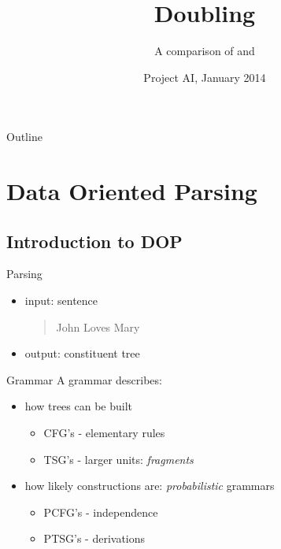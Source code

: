 \documentclass{beamer}
\title{Doubling \dops}
\subtitle{ A comparison of \ddop{} and \dops{}}
\author[Kruit, Veldhoen]{Benno Kruit\and Sara Veldhoen{\\\vspace{.6cm}\small Supervised by: \\Andreas van Cranenburg \and Khalil Sima'an}}
\institute{University of Amsterdam (UvA)}
\date{Project AI, January 2014}
\begin{document}
\begin{frame}
  \titlepage
\end{frame}

\begin{frame}{Outline}
  \tableofcontents   %
\end{frame}

\section{Data Oriented Parsing}

\subsection{Introduction to DOP}

\begin{frame}{Parsing}%

  \begin{itemize}
  \item input: sentence 
\begin{quotation} John Loves Mary \end{quotation}
\pause
  \item output: constituent tree
\begin{figure}

\end{figure}
  \end{itemize}
\end{frame}

\begin{frame}{Grammar}
A grammar describes:
\begin{itemize}
\item how trees can be built
\begin{itemize} 
\item CFG's - elementary rules
\item TSG's  - larger units: \emph{fragments}
\end{itemize}
\item how likely constructions are: \emph{probabilistic} grammars
\begin{itemize} 
\item PCFG's - independence 
\item PTSG's  - derivations
\end{itemize}

\end{itemize}
\end{frame}
\end{document}
